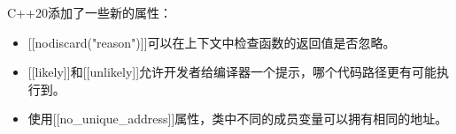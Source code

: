 \begin{tcolorbox}[breakable,enhanced jigsaw,colback=mygreen!5!white,colframe=mygreen!75!black,title={总结}]
C++20添加了一些新的属性：
\begin{itemize}
\item 
{}[[nodiscard("reason")]]可以在上下文中检查函数的返回值是否忽略。

\item 
{}[[likely]]和[[unlikely]]允许开发者给编译器一个提示，哪个代码路径更有可能执行到。

\item 
使用[[no\_unique\_address]]属性，类中不同的成员变量可以拥有相同的地址。
\end{itemize}
\end{tcolorbox}

\newpage
















